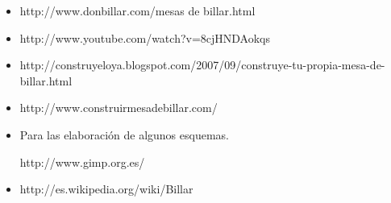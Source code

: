 \begin{itemize}

\item http://www.donbillar.com/mesas de billar.html
\item http://www.youtube.com/watch?v=8cjHNDAokqs
\item http://construyeloya.blogspot.com/2007/09/construye-tu-propia-mesa-de-billar.html
\item http://www.construirmesadebillar.com/
\item Para las elaboración de algunos esquemas.

 http://www.gimp.org.es/

\item http://es.wikipedia.org/wiki/Billar
\end{itemize}

